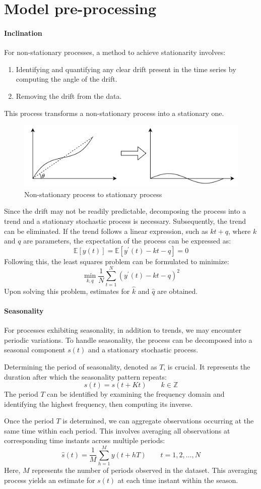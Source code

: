 \section{Model pre-processing}

\paragraph*{Inclination}
For non-stationary processes, a method to achieve stationarity involves:
\begin{enumerate}
    \item Identifying and quantifying any clear drift present in the time series by computing the angle of the drift.
    \item Removing the drift from the data.
\end{enumerate}
This process transforms a non-stationary process into a stationary one.
\begin{figure}[H]
    \centering
    \includegraphics[width=0.75\linewidth]{images/stat.png}
    \caption{Non-stationary process to stationary process}
\end{figure}
Since the drift may not be readily predictable, decomposing the process into a trend and a stationary stochastic process is necessary. 
Subsequently, the trend can be eliminated. 
If the trend follows a linear expression, such as $kt+q$, where $k$ and $q$ are parameters, the expectation of the process can be expressed as:
\[\mathbb{E}\left[y(t)\right]=\mathbb{E}\left[y^\prime(t)-kt-q\right]=0\]
Following this, the least squares problem can be formulated to minimize:
\[\min_{k,q}\dfrac{1}{N}\sum_{t=1}^{N}\left(y^\prime(t)-kt-q\right)^2\]
Upon solving this problem, estimates for $\hat{k}$ and $\hat{q}$ are obtained.

\paragraph*{Seasonality}
For processes exhibiting seasonality, in addition to trends, we may encounter periodic variations. 
To handle seasonality, the process can be decomposed into a seasonal component $s(t)$ and a stationary stochastic process.

Determining the period of seasonality, denoted as $T$, is crucial. 
It represents the duration after which the seasonality pattern repeats:
\[s(t)=s(t+Kt)\qquad k \in \mathbb{Z}\]
The period $T$ can be identified by examining the frequency domain and identifying the highest frequency, then computing its inverse.

Once the period $T$ is determined, we can aggregate observations occurring at the same time within each period. 
This involves averaging all observations at corresponding time instants across multiple periods:
\[\hat{s}(t)=\dfrac{1}{M}\sum_{h=1}^{M}y(t+hT)\qquad t=1,2,\dots,N\]
Here, $M$ represents the number of periods observed in the dataset.
This averaging process yields an estimate for $s(t)$ at each time instant within the season.